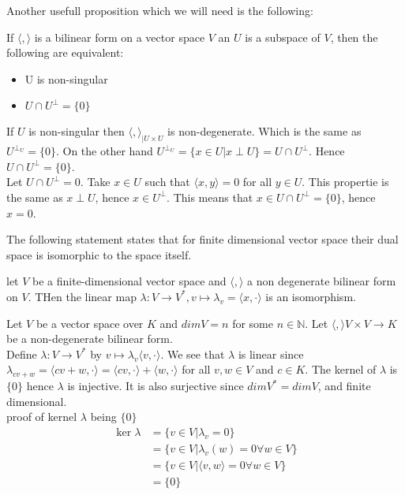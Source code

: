 \documentclass[../Thesis.tex]{subfiles}
\begin{document}
Another usefull proposition which we will need is the following:
\begin{prop}
If $\langle , \rangle$ is a bilinear form on a vector space $V$ an $U$ is a subspace of $V$, then the following are equivalent:
\begin{itemize}
\item U is non-singular
\item $U \cap U^\perp = \{0\}$
\end{itemize}
\end{prop}
\begin{myproof}
If $U$ is non-singular then $\langle , \rangle_{|U \times U}$ is non-degenerate. Which is the same as $U^{\perp_U} = \{0\}$. On the other hand $U^{\perp_U} = \{ x \in U| x \perp U\} = U \cap U^\perp$. Hence $U \cap U^\perp = \{0\}$.
\\Let $U \cap U^{\perp} = 0$. Take $x \in U$ such that $\langle x , y \rangle = 0$ for all $y \in U$. This propertie is the same as $x \perp U$, hence $x \in U^\perp$. This means that $x \in U\cap U^\perp = \{0\}$, hence $x = 0$.
\end{myproof}
The following statement states that for finite dimensional vector space their dual space is isomorphic to the space itself.
\begin{lemma}
let $V$ be a finite-dimensional vector space and $\langle , \rangle$ a non degenerate bilinear form on $V$. THen the linear map $\lambda : V \rightarrow V^*, v \mapsto \lambda_v = \langle x, \cdot \rangle$ is an isomorphism.
\end{lemma}
\begin{myproof}
Let $V$ be a vector space over $K$ and $dim V = n$ for some $n \in \mathbb{N}$. Let $\langle , \rangle V \times V \rightarrow K$ be a non-degenerate bilinear form.
\\Define $\lambda : V \rightarrow V^*$ by $v \mapsto \lambda_v \langle v, \cdot \rangle$. We see that $\lambda$ is linear since $\lambda_{c v + w} = \langle c v + w, \cdot \rangle = \langle cv, \cdot \rangle + \langle w, \cdot \rangle$ for all $v, w \in V$ and $c \in K$. The kernel of $\lambda$ is $\{0\}$ hence $\lambda$ is injective. It is also surjective since $dim V^* = dim V$, and finite dimensional.
\\proof of kernel $\lambda$ being $\{0\}$
\begin{align*}
\ker \lambda &= \{v \in V | \lambda_v = 0\}\\
             &= \{v \in V| \lambda_v(w) = 0 \forall w \in V\}\\
             &= \{v \in V| \langle v, w\rangle = 0 \forall w \in V\}\\
             &=\{0\}
\end{align*}
\end{myproof}
\end{document}
